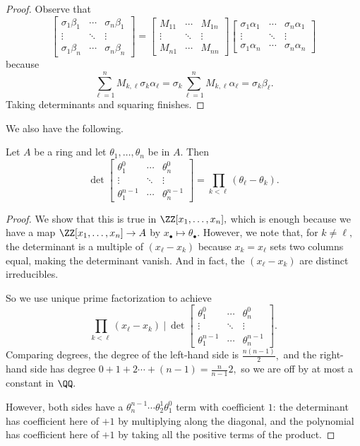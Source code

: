 \documentclass[../notes.tex]{subfiles}
\begin{document}
\begin{proof}
    Observe that
    \[\begin{bmatrix}
        \sigma_1\beta_1 & \cdots & \sigma_n\beta_1 \\
        \vdots & \ddots & \vdots \\
        \sigma_1\beta_n & \cdots & \sigma_n\beta_n
    \end{bmatrix}=\begin{bmatrix}
        M_{11} & \cdots & M_{1n} \\
        \vdots & \ddots & \vdots \\
        M_{n1} & \cdots & M_{nn}
    \end{bmatrix}\begin{bmatrix}
        \sigma_1\alpha_1 & \cdots & \sigma_n\alpha_1 \\
        \vdots & \ddots & \vdots \\
        \sigma_1\alpha_n & \cdots & \sigma_n\alpha_n
    \end{bmatrix}\]
    because
    \[\sum_{\ell=1}^nM_{k,\ell}\sigma_k\alpha_\ell=\sigma_k\sum_{\ell=1}^nM_{k,\ell}\alpha_\ell=\sigma_k\beta_\ell.\]
    Taking determinants and squaring finishes.
\end{proof}
We also have the following.
\begin{lem}
    Let $A$ be a ring and let $\theta_1,\ldots,\theta_n$ be in $A.$ Then
    \[\det\begin{bmatrix}
        \theta_1^0 & \cdots & \theta_n^0 \\
        \vdots & \ddots & \vdots \\
        \theta_1^{n-1} & \cdots & \theta_n^{n-1}
    \end{bmatrix}=\prod_{k<\ell}(\theta_\ell-\theta_k).\]
\end{lem}
\begin{proof}
    We show that this is true in $\ZZ[x_1,\ldots,x_n],$ which is enough because we have a map $\ZZ[x_1,\ldots,x_n]\to A$ by $x_\bullet\mapsto\theta_\bullet.$ However, we note that, for $k\ne\ell,$ the determinant is a multiple of $(x_\ell-x_k)$ because $x_k=x_\ell$ sets two columns equal, making the determinant vanish. And in fact, the $(x_\ell-x_k)$ are distinct irreducibles.
    
    So we use unique prime factorization to achieve
    \[\prod_{k<\ell}(x_\ell-x_k)~\bigg|~\det\begin{bmatrix}
        \theta_1^0 & \cdots & \theta_n^0 \\
        \vdots & \ddots & \vdots \\
        \theta_1^{n-1} & \cdots & \theta_n^{n-1}
    \end{bmatrix}.\]
    Comparing degrees, the degree of the left-hand side is $\frac{n(n-1)}2,$ and the right-hand side has degree $0+1+2\cdots+(n-1)=\frac n{n-1}2,$ so we are off by at most a constant in $\QQ.$
    
    However, both sides have a $\theta_n^{n-1}\cdots\theta_2^1\theta_1^0$ term with coefficient $1$: the determinant has coefficient here of $+1$ by multiplying along the diagonal, and the polynomial has coefficient here of $+1$ by taking all the positive terms of the product.
\end{proof}
\end{document}
